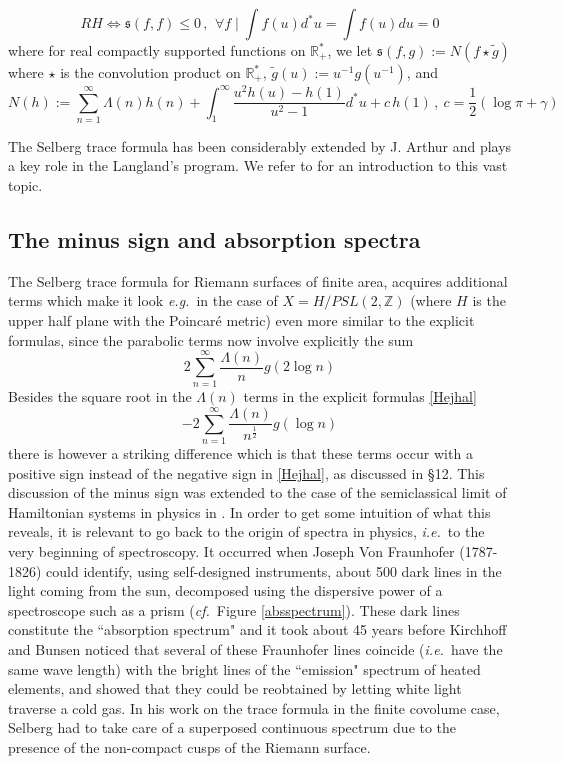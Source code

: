\documentclass[12pt]{article}
\def\qqq{\,,\quad~\forall}
\def\R{{\mathbb R}}
\def\Z{{\mathbb Z}}
\def\inter{{\mathfrak s}}
\def\qqq{\,,\,~\forall}
\newcommand{\ie}{{\it i.e.\/}\ }
\newcommand{\eg}{{\it e.g.\/}\ }
\newcommand{\cff}{{\it cf.}~}
\begin{document}
\begin{equation}\label{negcrit}
RH \iff \inter(f,f)\leq 0 \qqq f \mid \int f(u)d^*u=\int f(u)du=0
\end{equation}
where for real compactly supported functions on $\R_+^*$, we let $\inter(f,g):=N(f\star \tilde g)$ where $\star$ is the convolution product on $\R_+^*$,  $\tilde g(u):=u^{-1}g(u^{-1})$, and
\begin{equation}\label{negcrit1}
N(h):= \sum_{n=1}^\infty \Lambda(n)h(n)+ \int_1^\infty\frac{u^2h(u)-h(1)}{u^2-1}d^*u+c\, h(1)\,, \ c=\frac12(\log\pi+\gamma)
\end{equation}



The Selberg trace formula has been considerably extended by J. Arthur and plays a key role in the Langland's program. We refer to  \cite{Arthur} for an introduction to this vast topic.

\subsection{The minus sign and absorption spectra}
The Selberg  trace formula \cite{Selberg, [Se]} for Riemann surfaces of finite area, acquires additional terms which make it look \eg in the case of $X=H/PSL(2,\Z)$ (where $H$ is the upper half plane with the Poincar\'e metric) even more similar to the explicit formulas, since the parabolic terms now involve explicitly the sum $$2\sum_{n=1}^\infty \frac{\Lambda(n)}{n}g(2\log n)$$  
Besides the square root in  the $\Lambda(n)$ terms in the explicit formulas \eqref{Hejhal}
$$
-2\sum_{n=1}^\infty \frac{\Lambda(n)}{n^{\frac 12}}g(\log n)
$$
there is however a striking difference which is that these terms occur with a positive sign instead  of the   negative sign in  \eqref{Hejhal}, as discussed in \cite{Hejhal} \S 12. This discussion of the minus sign was extended to the case of the semiclassical limit of Hamiltonian
systems in physics in \cite{Berry}. In order to get some intuition of what this reveals, it is relevant to go back to the origin of spectra in physics, \ie to the very beginning of spectroscopy. It occurred  when Joseph Von Fraunhofer (1787-1826)  could identify, using self-designed instruments, about 500 dark lines in the light coming from the sun, decomposed using the dispersive power of a spectroscope such as a prism (\cff Figure \ref{absspectrum}). These dark lines constitute the ``absorption spectrum" and it took about 45 years  before  Kirchhoff and Bunsen noticed that several of these Fraunhofer lines coincide (\ie have the same wave length) with the bright lines of the  ``emission" spectrum of heated elements, and showed that they could be reobtained by letting white light traverse a cold gas.
In his work on the trace formula in the finite covolume case, Selberg had to take care of a superposed continuous spectrum due to the presence of the non-compact cusps of the Riemann surface. 
\end{document}
